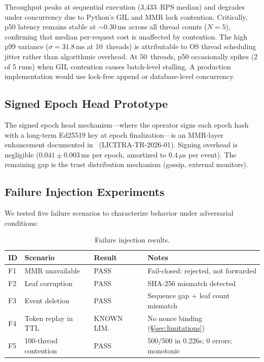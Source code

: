 \documentclass[11pt,a4paper]{article}
\begin{document}
Throughput peaks at sequential execution (3,433~RPS median) and degrades under concurrency
due to Python's GIL and MMR lock contention. Critically, p50 latency remains stable at
$\sim$0.30\,ms across all thread counts ($N=5$), confirming that median per-request cost is
unaffected by contention. The high p99 variance ($\sigma = 31.8$\,ms at 10~threads) is
attributable to OS thread scheduling jitter rather than algorithmic overhead. At 50~threads,
p50 occasionally spikes (2 of 5 runs) when GIL contention causes batch-level stalling. A
production implementation would use lock-free append or database-level concurrency.

\subsection{Signed Epoch Head Prototype}

The signed epoch head mechanism---where the operator signs each epoch hash with a long-term
Ed25519 key at epoch finalization---is an MMR-layer enhancement documented
in~\cite[{\S6.7}]{licitrammr} (LICITRA-TR-2026-01). Signing overhead is negligible
($0.041 \pm 0.003$\,ms per epoch, amortized to $0.4\,\mu$s per event). The remaining gap is
the trust distribution mechanism (gossip, external monitors).

\subsection{Failure Injection Experiments}\label{sec:failureinj}

We tested five failure scenarios to characterize behavior under adversarial conditions:

\begin{table}[ht]
\centering
\caption{Failure injection results.}
\label{tab:failure}
\begin{tabular}{@{}llll@{}}
\toprule
\textbf{ID} & \textbf{Scenario} & \textbf{Result} & \textbf{Notes} \\
\midrule
F1 & MMR unavailable     & PASS      & Fail-closed: rejected, not forwarded \\
F2 & Leaf corruption     & PASS      & SHA-256 mismatch detected \\
F3 & Event deletion      & PASS      & Sequence gap + leaf count mismatch \\
F4 & Token replay in TTL & KNOWN LIM.\ & No nonce binding (\S\ref{sec:limitations}) \\
F5 & 100-thread contention & PASS    & 500/500 in 0.226s; 0 errors; monotonic \\
\bottomrule
\end{tabular}
\end{table}
\end{document}
